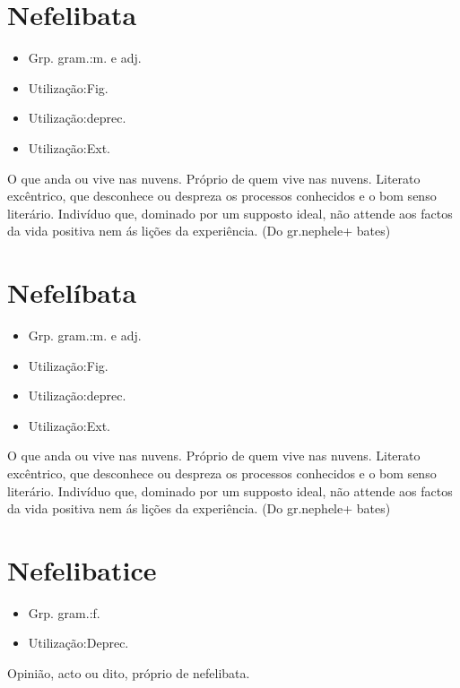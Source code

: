 \section{Nefelibata}
\begin{itemize}
\item {Grp. gram.:m.  e  adj.}
\end{itemize}
\begin{itemize}
\item {Utilização:Fig.}
\end{itemize}
\begin{itemize}
\item {Utilização:deprec.}
\end{itemize}
\begin{itemize}
\item {Utilização:Ext.}
\end{itemize}
O que anda ou vive nas nuvens.
Próprio de quem vive nas nuvens.
Literato excêntrico, que desconhece ou despreza os processos conhecidos e o bom senso literário.
Indivíduo que, dominado por um supposto ideal, não attende aos factos da vida positiva nem ás lições da experiência.
(Do gr.\textunderscore  nephele\textunderscore  + \textunderscore bates\textunderscore )
\section{Nefelíbata}
\begin{itemize}
\item {Grp. gram.:m.  e  adj.}
\end{itemize}
\begin{itemize}
\item {Utilização:Fig.}
\end{itemize}
\begin{itemize}
\item {Utilização:deprec.}
\end{itemize}
\begin{itemize}
\item {Utilização:Ext.}
\end{itemize}
O que anda ou vive nas nuvens.
Próprio de quem vive nas nuvens.
Literato excêntrico, que desconhece ou despreza os processos conhecidos e o bom senso literário.
Indivíduo que, dominado por um supposto ideal, não attende aos factos da vida positiva nem ás lições da experiência.
(Do gr.\textunderscore  nephele\textunderscore  + \textunderscore bates\textunderscore )
\section{Nefelibatice}
\begin{itemize}
\item {Grp. gram.:f.}
\end{itemize}
\begin{itemize}
\item {Utilização:Deprec.}
\end{itemize}
Opinião, acto ou dito, próprio de nefelibata.

